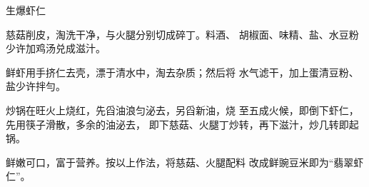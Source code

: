 \begin{recipe}{生爆虾仁}

\ingredients


\cooking

\step 	慈菇削皮，淘洗干净，与火腿分别切成碎丁。料酒、 胡椒面、味精、盐、水豆粉少许加鸡汤兑成滋汁。

\step 	鲜虾用手挤仁去壳，漂于清水中，淘去杂质；然后将 水气滤干，加上蛋清豆粉、盐少许拌勻。

\step 	炒锅在旺火上烧红，先舀油浪匀泌去，另舀新油，烧 至五成火候，即倒下虾仁，先用筷子滑散，多余的油泌去， 即下慈菇、火腿丁炒转，再下滋汁，炒几转即起锅。

\notes

鲜嫩可口，富于营养。按以上作法，将慈菇、火腿配料 改成鲜豌豆米即为“翡翠虾仁”。

\end{recipe}

